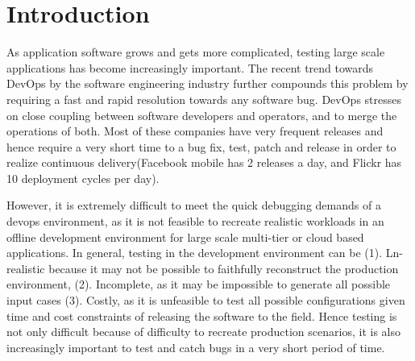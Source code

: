 \section{Introduction}
\label{sec:intro}


As application software grows and gets more complicated, testing large scale applications has become increasingly important. 
The recent trend towards DevOps\cite{devops} by the software engineering industry further compounds this problem by requiring a fast and rapid resolution towards any software bug.
DevOps stresses on close coupling between software developers and operators, and to merge the operations of both. 
Most of these companies have very frequent releases and hence require a very short time to a bug fix, test, patch and release in order to realize continuous delivery(Facebook mobile has 2 releases a day, and Flickr has 10 deployment cycles per day).

However, it is extremely difficult to meet the quick debugging demands of a devops environment, as it is not feasible to recreate realistic workloads in an offline development environment for large scale multi-tier or cloud based applications.
In general, testing in the development environment can be (1). Ln-realistic because it may not be possible to faithfully reconstruct the production environment, (2). Incomplete, as it may be impossible to generate all possible input cases (3). Costly, as it is unfeasible to test all possible configurations given time and cost constraints of releasing the software to the field. 
Hence testing is not only difficult because of difficulty to recreate production scenarios, it is also increasingly important to test and catch bugs in a very short period of time.

